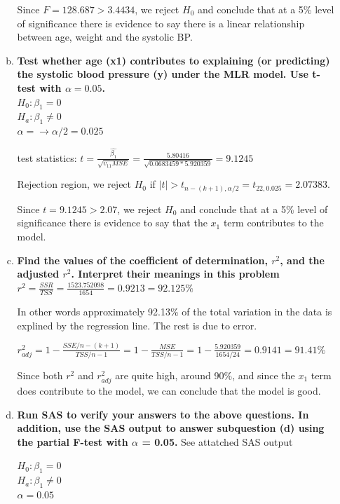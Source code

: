 \documentclass{article}
\begin{document}
\begin{enumerate}[1.]
\begin{enumerate}[(a)]
Since $F = 128.687 > 3.4434$, we reject $H_0$ and conclude that at a 5\% level of significance there is evidence to say there is a linear relationship between age, weight and the systolic BP.

\item \textbf{ Test whether age (x1) contributes to explaining (or predicting) the systolic blood pressure (y) under the MLR model. Use t-test with $\alpha = 0.05$. } \\

$H_0: \beta_1 = 0$ \\
$H_a: \beta_1 \neq 0$ \\
$\alpha = \to \alpha/2 =  0.025$

test statistics: $t = \frac{\hat{\beta_1}}{\sqrt{v_{11}MSE}} = \frac{5.80416}{\sqrt{0.0683459 * 5.920359}} = 9.1245$

Rejection region, we reject $H_0$ if $|t| > t_{n-(k+1), \alpha/2} = t_{22, 0.025} =  2.07383$.

Since $t =  9.1245 > 2.07$, we reject $H_0$ and conclude that at a 5\% level of significance there is evidence to say that the $x_1$ term contributes to the model.

\item \textbf{ Find the values of the coefficient of determination, $r^2$, and the adjusted $r^2$. Interpret their meanings in this problem} \\

$r^2 = \frac{SSR}{TSS} = \frac{1523.752098}{1654} = 0.9213 = 92.125\%$

In other words approximately 92.13\% of the total variation in the data is explined by the regression line. The rest is due to error.

$r_{adj}^2 = 1 - \frac{SSE/n-(k+1)}{TSS/n-1} = 1 - \frac{MSE}{TSS/n-1} = 1 - \frac{5.920359}{1654/24} = 0.9141 = 91.41\%$

Since both $r^2$ and $r_{adj}^2$ are quite high, around 90\%, and since the $x_1$ term does contribute to the model, we can conclude that the model is good.

\item \textbf{ Run SAS to verify your answers to the above questions. In addition, use the SAS output to answer subquestion (d) using the partial F-test with $\alpha$ = 0.05.} See attatched SAS output

$H_0: \beta_1 = 0$ \\
$H_a: \beta_1 \neq 0$ \\
$\alpha = 0.05$ \\


\end{enumerate}
\end{enumerate}
\end{document}
